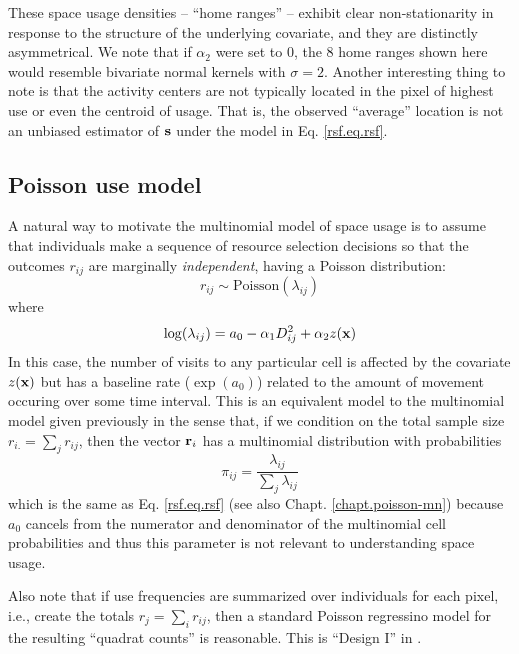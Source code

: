 These space usage densities -- ``home ranges'' -- exhibit clear
non-stationarity in response to the structure of the underlying
covariate, and they are distinctly asymmetrical.  We note that if
$\alpha_{2}$ were set to 0, the 8 home ranges shown here would
resemble bivariate normal kernels with $\sigma = 2$.  Another
interesting thing to note is that the activity centers are not
typically located in the pixel of highest use or even the centroid of
usage. That is, the observed ``average'' location is not an unbiased
estimator of ${\bf s}$ under the model in Eq. \ref{rsf.eq.rsf}.


\subsection{Poisson use model}

A natural way to motivate the multinomial model of space usage is to
assume that individuals make a sequence of resource selection
decisions so that the outcomes $r_{ij}$ are marginally {\it
  independent}, having a Poisson distribution:
\[
 r_{ij} \sim \mbox{Poisson}( \lambda_{ij})
\]
where
\[
 \log(\lambda_{ij}) = a_{0} -\alpha_{1} D_{ij}^{2} +  \alpha_{2} z({\bf x})
\]
In this case, the number of visits to any particular cell is affected
by the covariate $z({\bf x})$ but has a baseline rate ($\exp(a_{0})$)
related to the amount of movement occuring over some time interval.
This is an equivalent model to the multinomial
model given previously in the sense that, if we condition on the total
sample size $r_{i.} = \sum_{j} r_{ij}$, then the vector ${\bf r}_{i}$
has a multinomial distribution with probabilities
\[
 \pi_{ij} = \frac{\lambda_{ij}}{ \sum_{j} \lambda_{ij}}
\]
which is the same as Eq. \ref{rsf.eq.rsf} (see also
Chapt. \ref{chapt.poisson-mn}) because $a_{0}$ cancels
from the numerator and denominator of the
multinomial cell probabilities
and thus this parameter is not relevant to understanding
space usage.

Also note that if use frequencies are summarized over individuals for
each pixel, i.e.,
create the totals $r_j = \sum_i r_{ij}$, then
 a standard Poisson regressino model for the resulting  ``quadrat
 counts'' is reasonable. This is ``Design I'' in \citet{manly_etal:2002}.

